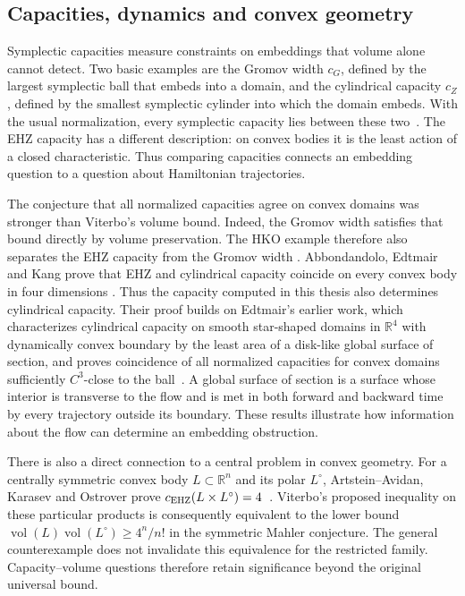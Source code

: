 \subsection{Capacities, dynamics and convex geometry}

Symplectic capacities measure constraints on embeddings that volume alone
cannot detect. Two basic examples are the Gromov width $c_G$, defined by
the largest symplectic ball that embeds into a domain, and the cylindrical
capacity $c_Z$, defined by the smallest symplectic cylinder into which the
domain embeds. With the usual normalization, every symplectic capacity lies
between these two~\cite{Edtmair2024}. The EHZ capacity has a different
description: on convex bodies it is the least action of a closed
characteristic. Thus comparing capacities connects an embedding question
to a question about Hamiltonian trajectories.

The conjecture that all normalized capacities agree on convex domains was
stronger than Viterbo's volume bound. Indeed, the Gromov width satisfies
that bound directly by volume preservation. The HKO example therefore
also separates the EHZ capacity from the Gromov width
\cite{HaimKislevOstrover2024}. Abbondandolo, Edtmair and Kang prove that EHZ and cylindrical capacity
coincide on every convex body in four dimensions
\cite[Corollary~1]{AbbondandoloEdtmairKang2024}. Thus the capacity computed
in this thesis also determines cylindrical capacity. Their proof builds on
Edtmair's earlier work, which characterizes
cylindrical capacity on smooth star-shaped domains in $\mathbb R^4$ with
dynamically convex boundary by the
least area of a disk-like global surface of section, and proves coincidence
of all normalized capacities for convex domains sufficiently $C^3$-close
to the ball~\cite{Edtmair2024}. A global surface of section is a surface
whose interior is transverse to the flow and is met in both forward and
backward time by every trajectory outside its boundary. These results illustrate how information about the
flow can determine an embedding obstruction.

There is also a direct connection to a central problem in convex geometry.
For a centrally symmetric convex body $L\subset\mathbb R^n$ and its polar
$L^\circ$, Artstein--Avidan, Karasev and Ostrover prove
$c_{\rm EHZ}(L\times L^\circ)=4$~\cite{AKO2014}. Viterbo's proposed
inequality on these particular products is consequently equivalent to the
lower bound $\operatorname{vol}(L)\operatorname{vol}(L^\circ)\geq4^n/n!$
in the symmetric Mahler conjecture. The general counterexample does not
invalidate this equivalence for the restricted family. Capacity--volume
questions therefore retain significance beyond the original universal bound.

